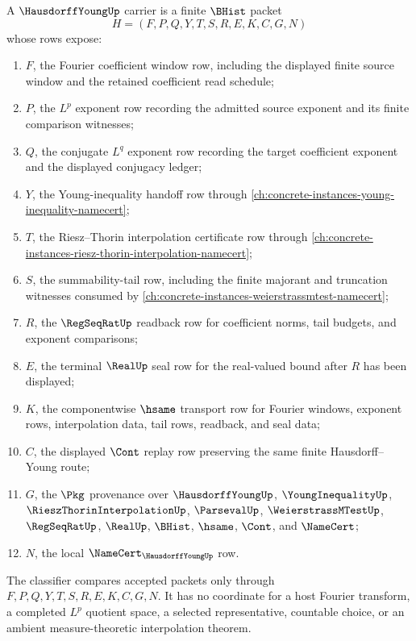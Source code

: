 \begin{definition}
\label{def:hausdorff-young-carrier}
A $\HausdorffYoungUp$ carrier is a finite $\BHist$ packet
$$
H=(F,P,Q,Y,T,S,R,E,K,C,G,N)
$$
whose rows expose:
\begin{enumerate}
\item $F$, the Fourier coefficient window row, including the displayed finite source window and the retained coefficient read schedule;
\item $P$, the $L^p$ exponent row recording the admitted source exponent and its finite comparison witnesses;
\item $Q$, the conjugate $L^q$ exponent row recording the target coefficient exponent and the displayed conjugacy ledger;
\item $Y$, the Young-inequality handoff row through \autoref{ch:concrete-instances-young-inequality-namecert};
\item $T$, the Riesz--Thorin interpolation certificate row through \autoref{ch:concrete-instances-riesz-thorin-interpolation-namecert};
\item $S$, the summability-tail row, including the finite majorant and truncation witnesses consumed by \autoref{ch:concrete-instances-weierstrassmtest-namecert};
\item $R$, the $\RegSeqRatUp$ readback row for coefficient norms, tail budgets, and exponent comparisons;
\item $E$, the terminal $\RealUp$ seal row for the real-valued bound after $R$ has been displayed;
\item $K$, the componentwise $\hsame$ transport row for Fourier windows, exponent rows, interpolation data, tail rows, readback, and seal data;
\item $C$, the displayed $\Cont$ replay row preserving the same finite Hausdorff--Young route;
\item $G$, the $\Pkg$ provenance over $\HausdorffYoungUp$, $\YoungInequalityUp$, $\RieszThorinInterpolationUp$, $\ParsevalUp$, $\WeierstrassMTestUp$, $\RegSeqRatUp$, $\RealUp$, $\BHist$, $\hsame$, $\Cont$, and $\NameCert$;
\item $N$, the local $\NameCert_{\HausdorffYoungUp}$ row.
\end{enumerate}
The classifier compares accepted packets only through $F,P,Q,Y,T,S,R,E,K,C,G,N$. It has no coordinate for a host Fourier transform, a completed $L^p$ quotient space, a selected representative, countable choice, or an ambient measure-theoretic interpolation theorem.
\end{definition}


